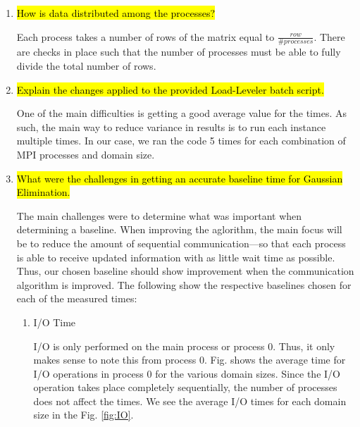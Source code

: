 \begin{enumerate}
We ran vampir on the baseline process to observe the blocking \verb!MPI_Send! and \verb!MPI_Recv! functions. This can be seen in Fig. \ref{fig:vampir_baseline}.

 \begin{figure}[h] %
 	\begin{center}
  		\texttt{[image: Baseline/vampir\_baseline.png]} %
  		\caption{Vampir Benchmark}
  		\label{fig:vampir_baseline}
  	\end{center}
 \end{figure}

	\item \hl{How is data distributed among the processes?}

	Each process takes a number of rows of the matrix equal to $\frac{row}{\#processes}$. There are checks in place such that the number of processes must be able to fully divide the total number of rows.

	\item \hl{Explain the changes applied to the provided Load-Leveler batch script.}

	One of the main difficulties is getting a good average value for the times. As such, the main way to reduce variance in results is to run each instance multiple times. In our case, we ran the code 5 times for each combination of MPI processes and domain size.

	\vspace{5mm} %
	\item \hl{What were the challenges in getting an accurate baseline time for Gaussian Elimination.}

	The main challenges were to determine what was important when determining a baseline. When improving the aglorithm, the main focus will be to reduce the amount of sequential communication---so that each process is able to receive updated information with as little wait time as possible. Thus, our chosen baseline should show improvement when the communication algorithm is improved. The following show the respective baselines chosen for each of the measured times:
\begin{enumerate}
	\item I/O Time

	I/O is only performed on the main process or process 0. Thus, it only makes sense to note this from process 0. Fig. shows the average time for I/O operations in process 0 for the various domain sizes. Since the I/O operation takes place completely sequentially, the number of processes does not affect the times. We see the average I/O times for each domain size in the Fig. \ref{fig:IO}.
	

\end{enumerate}
\end{enumerate}
